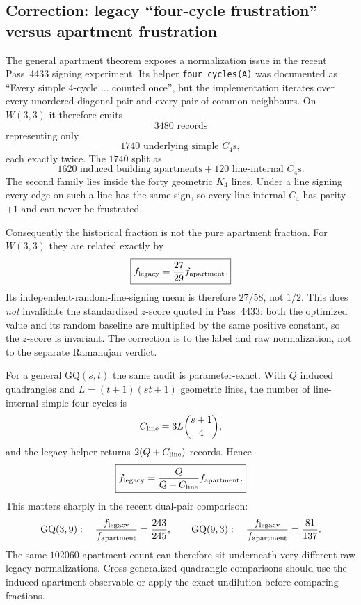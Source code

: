 \subsection{Correction: legacy ``four-cycle frustration'' versus apartment frustration}
\label{sec:pass4466-four-cycle-audit}

The general apartment theorem exposes a normalization issue in the recent
Pass~4433 signing experiment.  Its helper
\texttt{four\_cycles(A)} was documented as ``Every simple 4-cycle ... counted
once'', but the implementation iterates over every unordered diagonal pair and
every pair of common neighbours.  On $W(3,3)$ it therefore emits
\[
 \boxed{3480\text{ records}}
\]
representing only
\[
 \boxed{1740\text{ underlying simple }C_4\text{s}},
\]
each exactly twice.  The $1740$ split as
\[
 \boxed{1620\text{ induced building apartments}+120\text{ line-internal }C_4\text{s}.}
\]
The second family lies inside the forty geometric $K_4$ lines.  Under a line
signing every edge on such a line has the same sign, so every line-internal
$C_4$ has parity $+1$ and can never be frustrated.

Consequently the historical fraction is not the pure apartment fraction.  For
$W(3,3)$ they are related exactly by
\begin{equation}
 \boxed{
 f_{\rm legacy}=\frac{27}{29}f_{\rm apartment}.}
 \label{eq:pass4466-w33-dilution}
\end{equation}
Its independent-random-line-signing mean is therefore $27/58$, not $1/2$.
This does \emph{not} invalidate the standardized $z$-score quoted in
Pass~4433: both the optimized value and its random baseline are multiplied by
the same positive constant, so the $z$-score is invariant.  The correction is
to the label and raw normalization, not to the separate Ramanujan verdict.

For a general $\mathrm{GQ}(s,t)$ the same audit is parameter-exact.  With
$Q$ induced quadrangles and $L=(t+1)(st+1)$ geometric lines, the number of
line-internal simple four-cycles is
\[
 C_{\rm line}=3L\binom{s+1}{4},
\]
and the legacy helper returns $2(Q+C_{\rm line})$ records.  Hence
\begin{equation}
 \boxed{
 f_{\rm legacy}=\frac{Q}{Q+C_{\rm line}}f_{\rm apartment}.}
 \label{eq:pass4466-general-dilution}
\end{equation}
This matters sharply in the recent dual-pair comparison:
\[
 \mathrm{GQ}(3,9):\quad \frac{f_{\rm legacy}}{f_{\rm apartment}}=\frac{243}{245},
 \qquad
 \mathrm{GQ}(9,3):\quad \frac{f_{\rm legacy}}{f_{\rm apartment}}=\frac{81}{137}.
\]
The same $102060$ apartment count can therefore sit underneath very different
raw legacy normalizations.  Cross-generalized-quadrangle comparisons should use
the induced-apartment observable or apply the exact undilution before comparing
fractions.

